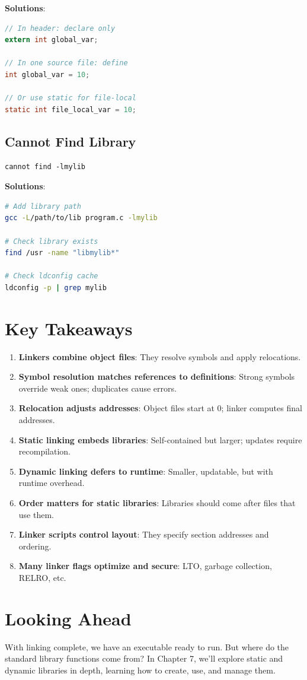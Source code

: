 \textbf{Solutions}:
\begin{lstlisting}[language=C]
// In header: declare only
extern int global_var;

// In one source file: define
int global_var = 10;

// Or use static for file-local
static int file_local_var = 10;
\end{lstlisting}

\subsection{Cannot Find Library}

\begin{verbatim}
cannot find -lmylib
\end{verbatim}

\textbf{Solutions}:
\begin{lstlisting}[language=bash]
# Add library path
gcc -L/path/to/lib program.c -lmylib

# Check library exists
find /usr -name "libmylib*"

# Check ldconfig cache
ldconfig -p | grep mylib
\end{lstlisting}

\section{Key Takeaways}

\begin{enumerate}
    \item \textbf{Linkers combine object files}: They resolve symbols and apply relocations.
    \item \textbf{Symbol resolution matches references to definitions}: Strong symbols override weak ones; duplicates cause errors.
    \item \textbf{Relocation adjusts addresses}: Object files start at 0; linker computes final addresses.
    \item \textbf{Static linking embeds libraries}: Self-contained but larger; updates require recompilation.
    \item \textbf{Dynamic linking defers to runtime}: Smaller, updatable, but with runtime overhead.
    \item \textbf{Order matters for static libraries}: Libraries should come after files that use them.
    \item \textbf{Linker scripts control layout}: They specify section addresses and ordering.
    \item \textbf{Many linker flags optimize and secure}: LTO, garbage collection, RELRO, etc.
\end{enumerate}

\section{Looking Ahead}

With linking complete, we have an executable ready to run. But where do the standard library functions come from? In Chapter 7, we'll explore static and dynamic libraries in depth, learning how to create, use, and manage them.
